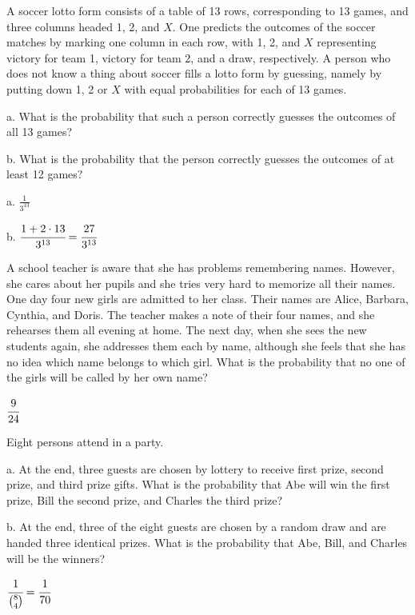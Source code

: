 \begin{defproblem}{1}
\begin{onlyproblem}
A soccer lotto form consists of a table of 13 rows, corresponding to 13 games, and three columns headed 1, 2, and $X$. One predicts the outcomes of the soccer matches by marking one column in each row, with 1, 2, and $X$ representing victory for team 1, victory for team 2, and a draw, respectively. A person who does not know a thing about soccer fills a lotto form by guessing, namely by putting down 1, 2 or $X$ with equal probabilities for each of 13 games.

a. What is the probability that such a person correctly guesses the outcomes of all 13 games?

b. What is the probability that the person correctly guesses the outcomes of at least 12 games?
\end{onlyproblem}
\begin{onlysolution}
 a. $\frac{1}{3^{13}}$

 b. $\cfrac{1+2\cdot 13}{3^{13}}=\cfrac{27}{3^{13}}$
\end{onlysolution}
\end{defproblem}
\begin{defproblem}{2}
\begin{onlyproblem}
A school teacher is aware that she has problems remembering names. However, she cares about her pupils and she tries very hard to memorize all their names. One day four new girls are admitted to her class. Their names are Alice, Barbara, Cynthia, and Doris. The teacher makes a note of their four names, and she rehearses them all evening at home. The next day, when she sees the new students again, she addresses them each by name, although she feels that she has no idea which name belongs to which girl. What is the probability that no one of the girls will be called by her own name?
\end{onlyproblem}
\begin{onlysolution}
 $\cfrac{9}{24}$
\end{onlysolution}
\end{defproblem}
\begin{defproblem}{3}
\begin{onlyproblem}
Eight persons attend in a party.

a. At the end, three guests are chosen by lottery to receive first prize, second prize, and third prize gifts. What is the probability that Abe will win the first prize, Bill the second prize, and Charles the third prize?

b. At the end, three of the eight guests are chosen by a random draw and are handed three identical prizes. What is the probability that Abe, Bill, and Charles will be the winners?
\end{onlyproblem}
\begin{onlysolution}
 $\cfrac{1}{{8\choose 4}}=\cfrac{1}{70}$
\end{onlysolution}
\end{defproblem}
